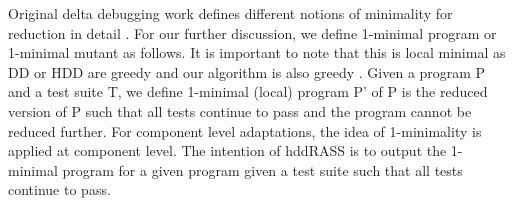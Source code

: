 
Original delta debugging work defines different notions of minimality for reduction in detail \cite{ddOriginal}. For our further discussion, we define 1-minimal program or 1-minimal mutant as follows. It is important to note that this is local minimal as DD or HDD are greedy and our algorithm is also greedy \cite{ddOriginal, hddOriginal}. Given a program P and a  test suite T, we define 1-minimal (local) program P' of P is the reduced version of P such that all tests continue to pass and the program cannot be reduced further. For component level adaptations, the idea of 1-minimality is applied at component level. The intention of hddRASS is to output the 1-minimal program for a given program given a test suite such that all tests continue to pass. 